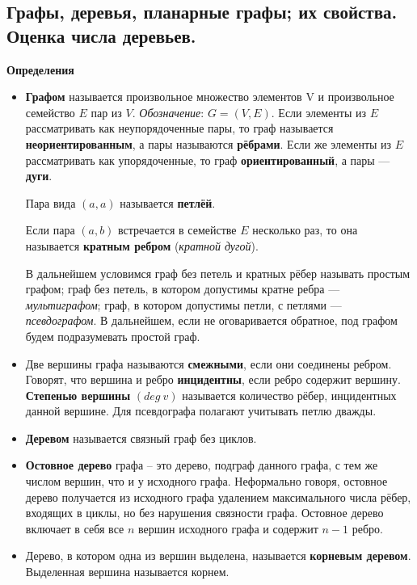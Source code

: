 \subsection{Графы,  деревья,  планарные графы;  их свойства.  Оценка числа деревьев.}

\textbf{Определения}
\begin{itemize}
\item \textbf{Графом} называется произвольное множество элементов V и произвольное семейство $E$ пар из $V$. \textit{Обозначение}: $G = (V, E)$.
Если элементы из $E$ рассматривать как неупорядоченные пары, то граф называется \textbf{неориентированным}, а пары называются \textbf{рёбрами}. 
Если же элементы из $E$ рассматривать как упорядоченные, то граф \textbf{ориентированный}, а пары --- \textbf{дуги}.

Пара вида $(a, a)$ называется \textbf{петлёй}.

Если пара $(a, b)$ встречается в семействе $E$ несколько раз, то она называется \textbf{кратным ребром} (\textit{кратной дугой}).


В дальнейшем условимся граф без петель и кратных рёбер называть простым графом; граф без петель, в котором допустимы кратне ребра --- \textit{мультиграфом}; граф, в котором допустимы петли, с петлями --- \textit{псевдографом}. В дальнейшем, если не оговаривается обратное, под графом будем подразумевать простой граф.

\item Две вершины графа называются \textbf{смежными}, если они соединены ребром. Говорят, что вершина и ребро \textbf{инцидентны}, если ребро содержит вершину. \textbf{Степенью вершины} $(deg~v)$ называется количество рёбер, инцидентных данной вершине. Для псевдографа полагают учитывать петлю дважды.

\item \textbf{Деревом} называется связный граф без циклов. %

\item \textbf{Остовное дерево} графа -- это дерево, подграф данного графа, с тем же числом вершин, что и у исходного графа. Неформально говоря, остовное дерево получается из исходного графа удалением максимального числа рёбер, входящих в циклы, но без нарушения связности графа. Остовное дерево включает в себя все $n$ вершин исходного графа и содержит $n-1$ ребро.


\item  Дерево, в котором одна из вершин выделена, называется \textbf{корневым деревом}. Выделенная вершина называется корнем.


\end{itemize}
